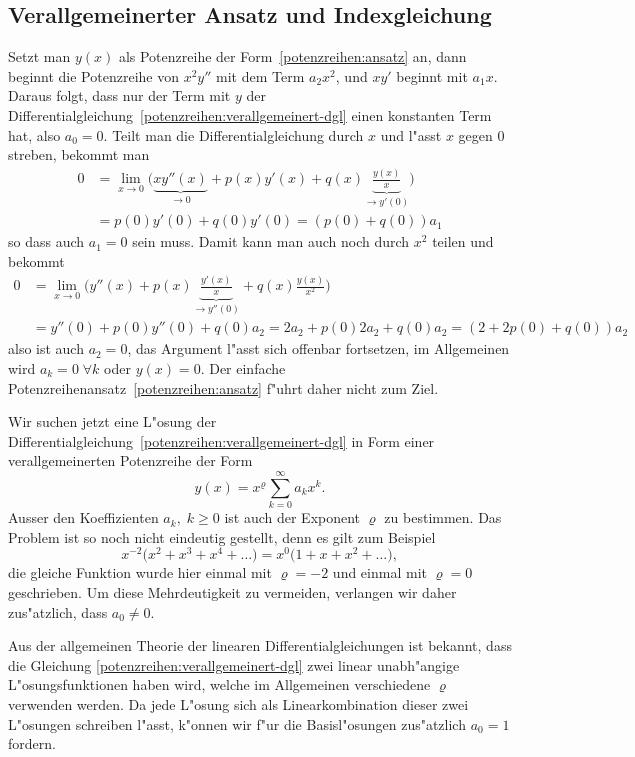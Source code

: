 \subsection{Verallgemeinerter Ansatz und Indexgleichung}
\label{subsection:potenzreihen:indexgleichung}
Setzt man $y(x)$ als Potenzreihe der Form~\eqref{potenzreihen:ansatz} an,
dann beginnt die Potenzreihe von $x^2y''$ mit dem Term $a_2x^2$,
und $xy'$ beginnt mit $a_1x$.
Daraus folgt, dass nur der Term mit $y$ der
Differentialgleichung~\eqref{potenzreihen:verallgemeinert-dgl}
einen konstanten Term hat, also $a_0=0$.
Teilt man die Differentialgleichung durch $x$ und l"asst $x$ gegen $0$
streben, bekommt man
\begin{align*}
0&=
\lim_{x\to 0}\biggl(
\underbrace{xy''(x)}_{\to 0}+p(x)y'(x)+q(x)\underbrace{\frac{y(x)}{x}}_{\to y'(0)}\biggr)
\\
&=
p(0)y'(0)+q(0)y'(0)
=(p(0)+q(0))a_1
\end{align*}
so dass auch $a_1=0$ sein muss.
Damit kann man auch noch durch $x^2$ teilen und bekommt
\begin{align*}
0&=
\lim_{x\to 0}\biggl(
y''(x)+p(x)\underbrace{\frac{y'(x)}{x}}_{\to y''(0)}+q(x)\frac{y(x)}{x^2}
\biggr)
\\
&=y''(0)+p(0)y''(0)+q(0)a_2
=2a_2+p(0)2a_2+q(0)a_2
=(2+2p(0)+q(0))a_2
\end{align*}
also ist auch $a_2=0$, das Argument l"asst sich offenbar fortsetzen, 
im Allgemeinen wird $a_k=0\;\forall k$ oder $y(x)=0$.
Der einfache Potenzreihenansatz~\eqref{potenzreihen:ansatz} f"uhrt
daher nicht zum Ziel.

Wir suchen jetzt eine L"osung der
Differentialgleichung~\eqref{potenzreihen:verallgemeinert-dgl}
in Form einer verallgemeinerten Potenzreihe der Form
\begin{equation}
y(x)=x^\varrho\sum_{k=0}^\infty a_kx^k.
\label{potenzreihen:verallgemeinert}
\end{equation}
%
%
Ausser den Koeffizienten $a_k,\;k\ge 0$ ist auch der Exponent
$\varrho$ zu bestimmen.
Das Problem ist so noch nicht eindeutig gestellt, denn es gilt zum Beispiel
\[
x^{-2}\bigl(x^2 + x^3 + x^4 + \dots\bigr)
=
x^{0}\bigl(1+x + x^2 + \dots\bigr),
\]
die gleiche Funktion wurde hier einmal mit $\varrho=-2$ und einmal
mit $\varrho=0$ geschrieben.
Um diese Mehrdeutigkeit zu vermeiden,
verlangen wir daher zus"atzlich, dass $a_0\ne 0$.

Aus der allgemeinen Theorie der linearen Differentialgleichungen
ist bekannt, dass die Gleichung \eqref{potenzreihen:verallgemeinert-dgl}
zwei linear unabh"angige L"osungsfunktionen haben wird,
welche im Allgemeinen verschiedene $\varrho$ verwenden werden.
Da jede L"osung sich als Linearkombination dieser zwei L"osungen schreiben
l"asst, k"onnen wir f"ur die Basisl"osungen zus"atzlich $a_0=1$ fordern.

